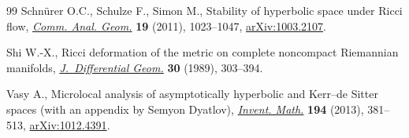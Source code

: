 \documentclass[pdftex]{sigma}
\numberwithin{equation}{section}
\begin{document}
\begin{thebibliography}{99}
Schn\"{u}rer O.C., Schulze F., Simon M., Stability of hyperbolic space under
 {R}icci flow, \href{https://doi.org/10.4310/CAG.2011.v19.n5.a8}{\textit{Comm. Anal. Geom.}} \textbf{19} (2011), 1023--1047,
 \href{https://arxiv.org/abs/1003.2107}{arXiv:1003.2107}.

Shi W.-X., Ricci deformation of the metric on complete noncompact {R}iemannian
 manifolds, \href{https://doi.org/10.4310/jdg/1214443595}{\textit{J.~Differential Geom.}} \textbf{30} (1989), 303--394.

Vasy A., Microlocal analysis of asymptotically hyperbolic and {K}err--de
 {S}itter spaces (with an appendix by {S}emyon {D}yatlov), \href{https://doi.org/10.1007/s00222-012-0446-8}{\textit{Invent.
 Math.}} \textbf{194} (2013), 381--513, \href{https://arxiv.org/abs/1012.4391}{arXiv:1012.4391}.

\end{thebibliography}\LastPageEnding
\end{document}
